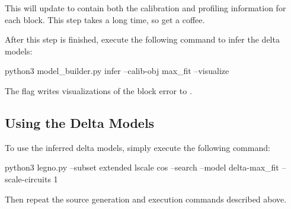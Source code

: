 This will update  to contain both the calibration and
profiling information for each block. This step takes a long time, so get a
coffee.

After this step is finished, execute the following command to infer the delta models:

\begin{snippet}
  python3 model_builder.py infer --calib-obj max_fit --visualize
\end{snippet}

The  flag writes visualizations of the block error to .


\subsection{Using the Delta Models}

To use the inferred delta models, simply execute the following command:
 
\begin{snippet}
  python3 legno.py --subset extended lscale cos --search
     --model delta-max_fit --scale-circuits 1
\end{snippet}

Then repeat the source generation and execution commands described above.

